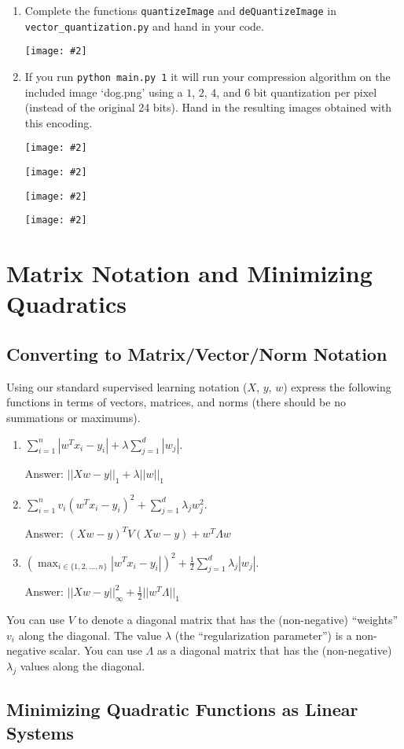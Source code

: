 \documentclass{article}
\newcommand{\blu}[1]{{\textcolor{blu}{#1}}}
\newcommand{\gre}[1]{\textcolor{gre}{#1}}
\newcommand\ans[1]{\par\gre{Answer: #1}}
\def\half{\frac 1 2}
\newcommand{\centerfig}[2]{\begin{center}\texttt{[image: \#2]}\end{center}}
\begin{document}
\blu{\begin{enumerate}
\item Complete the functions \texttt{quantizeImage} and \texttt{deQuantizeImage} in \texttt{vector\_quantization.py} and hand in your code.
\centerfig{0.8}{q1.1.png}
\item If you run \texttt{python main.py 1} it will run your compression algorithm on the included image `dog.png' using a $1$, $2$, $4$, and $6$ bit quantization per pixel (instead of the original 24 bits). Hand in the resulting images obtained with this encoding.
\centerfig{0.5}{dog_1.png}
\centerfig{0.5}{dog_2.png}
\centerfig{0.5}{dog_4.png}
\centerfig{0.5}{dog_6.png}
\end{enumerate}}

\pagebreak

\section{Matrix Notation and Minimizing Quadratics}


\subsection{Converting to Matrix/Vector/Norm Notation }

Using our standard supervised learning notation ($X$, $y$, $w$)
express the following functions in terms of vectors, matrices, and norms (there should be no summations or maximums).
\blu{\begin{enumerate}
\item $\sum_{i=1}^n  |w^Tx_i - y_i| + \lambda \sum_{j=1}^{d} |w_j|$.
\ans{$||Xw-y||_1+\lambda ||w||_1$}
\item $\sum_{i=1}^n v_i (w^Tx_i - y_i)^2 + \sum_{j=1}^{d} \lambda_j w_j^2$.
\ans{$(Xw-y)^TV(Xw-y)+w^T\Lambda w$}
\item $\left(\max_{i \in \{1,2,\dots,n\}} |w^Tx_i - y_i|\right)^2 +  \half\sum_{j=1}^{d} \lambda_j|w_j|$.
\ans{$||Xw-y||_\infty^2+\frac{1}{2}||w^T\Lambda||_1$}
\end{enumerate}}


You can use $V$ to denote a diagonal matrix that has the (non-negative) ``weights'' $v_i$ along the diagonal. The value $\lambda$ (the ``regularization parameter'') is a non-negative scalar. You can use $\Lambda$ as a diagonal matrix that has the (non-negative) $\lambda_j$ values along the diagonal.

\pagebreak

\subsection{Minimizing Quadratic Functions as Linear Systems } \label{sec:lin-sys}
\end{document}
